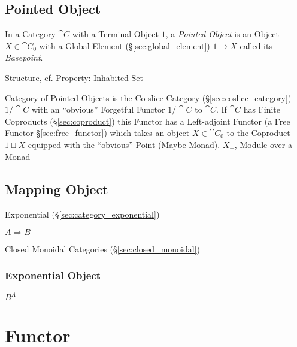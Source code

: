 \subsection{Pointed Object}\label{sec:pointed_object}

In a Category $\cat{C}$ with a Terminal Object $1$, a \emph{Pointed
  Object} is an Object $X \in \cat{C}_0$ with a Global Element
(\S\ref{sec:global_element}) $1 \rightarrow X$ called its
\emph{Basepoint}.

Structure, cf. Property: Inhabited Set %

Category of Pointed Objects is the Co-slice Category
(\S\ref{sec:coslice_category}) $1/\cat{C}$ with an ``obvious''
Forgetful Functor $1 / \cat{C}$ to $\cat{C}$. If $\cat{C}$ has Finite
Coproducts (\S\ref{sec:coproduct}) this Functor has a Left-adjoint
Functor (a Free Functor \S\ref{sec:free_functor}) which takes an
object $X \in \cat{C}_0$ to the Coproduct $1 \sqcup X$ equipped with
the ``obvious'' Point (Maybe Monad). $X_+$, Module over a Monad %



\subsection{Mapping Object}\label{sec:mapping_object}

Exponential (\S\ref{sec:category_exponential})

$A \Rightarrow B$

Closed Monoidal Categories (\S\ref{sec:closed_monoidal})



\subsubsection{Exponential Object}\label{sec:exponential_object}

$B^A$



\section{Functor}\label{sec:functor}

